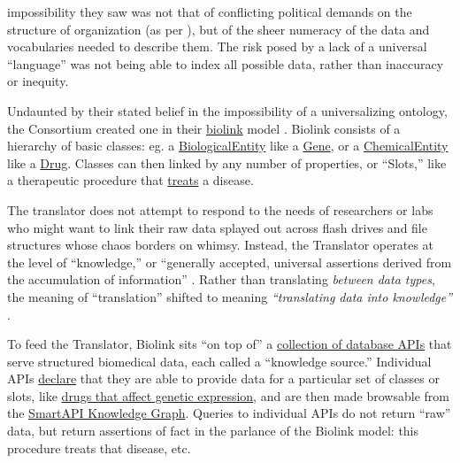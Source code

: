 impossibility they saw was not that of conflicting political demands on
the structure of organization (as per \citep{bowkerSortingThingsOut1999} ), but of the sheer numeracy of the data
and vocabularies needed to describe them. The risk posed by a lack of a
universal ``language'' was not being able to index all possible data,
rather than inaccuracy or inequity.

Undaunted by their stated belief in the impossibility of a
universalizing ontology, the Consortium created one in their
\href{https://biolink.github.io/biolink-model/docs/}{biolink} model \citep{bruskiewichBiolinkBiolinkmodel2021, unniBiolinkModelUniversal2022} . Biolink consists of a hierarchy of basic classes: eg. a
\href{https://biolink.github.io/biolink-model/docs/BiologicalEntity.html}{BiologicalEntity}
like a
\href{https://biolink.github.io/biolink-model/docs/Gene.html}{Gene}, or
a
\href{https://biolink.github.io/biolink-model/docs/ChemicalEntity.html}{ChemicalEntity}
like a
\href{https://biolink.github.io/biolink-model/docs/Drug.html}{Drug}.
Classes can then linked by any number of properties, or ``Slots,'' like
a therapeutic procedure that
\href{https://biolink.github.io/biolink-model/docs/treats.html}{treats}
a disease.

The translator does not attempt to respond to the needs of researchers
or labs who might want to link their raw data splayed out across flash
drives and file structures whose chaos borders on whimsy. Instead, the
Translator operates at the level of ``knowledge,'' or ``generally
accepted, universal assertions derived from the accumulation of
information'' \citep{fechoProgressUniversalBiomedical2022} .
Rather than translating \emph{between data types}, the meaning of
``translation'' shifted to meaning \emph{``translating data into
knowledge''} \citep{consortiumUniversalBiomedicalData2019} .

To feed the Translator, Biolink sits ``on top of'' a
\href{http://www.smart-api.info/registry}{collection of database APIs}
that serve structured biomedical data, each called a ``knowledge
source.'' Individual APIs
\href{https://github.com/NCATSTranslator/ReasonerAPI}{declare} that they
are able to provide data for a particular set of classes or slots, like
\href{http://www.smart-api.info/ui/adf20dd6ff23dfe18e8e012bde686e31}{drugs
that affect genetic expression}, and are then made browsable from the
\href{http://www.smart-api.info/portal/translator/metakg}{SmartAPI
Knowledge Graph}. Queries to individual APIs do not return ``raw'' data,
but return assertions of fact in the parlance of the Biolink model: this
procedure treats that disease, etc.

